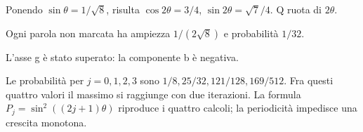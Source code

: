 Ponendo \(\sin\theta=1/\sqrt8\), risulta \(\cos2\theta=3/4\), \(\sin2\theta=\sqrt7/4\). Q ruota di \(2\theta\).


Ogni parola non marcata ha ampiezza \(1/(2\sqrt8)\) e probabilità \(1/32\).


L’asse g è stato superato: la componente b è negativa.




Le probabilità per \(j=0,1,2,3\) sono \(1/8,25/32,121/128,169/512\). Fra questi quattro valori il massimo si raggiunge con due iterazioni. La formula \(P_j=\sin^2((2j+1)\theta)\) riproduce i quattro calcoli; la periodicità impedisce una crescita monotona.

